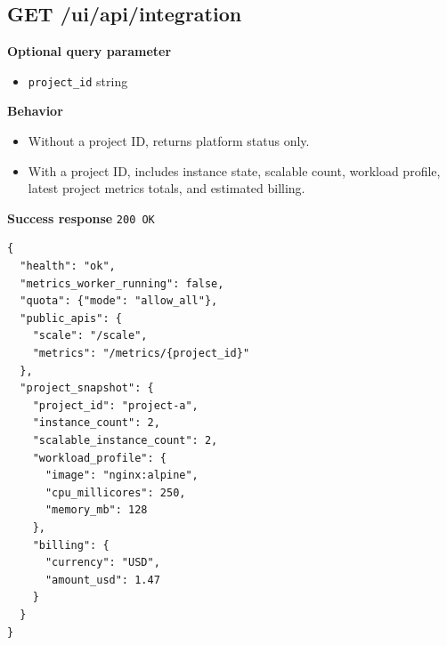 \documentclass[11pt]{article}
\begin{document}
\subsection*{GET /ui/api/integration}
\textbf{Optional query parameter}
\begin{itemize}
\item \texttt{project\_id} string
\end{itemize}
\textbf{Behavior}
\begin{itemize}
\item Without a project ID, returns platform status only.
\item With a project ID, includes instance state, scalable count, workload profile, latest project metrics totals, and estimated billing.
\end{itemize}
\textbf{Success response} \texttt{200 OK}
\begin{verbatim}
{
  "health": "ok",
  "metrics_worker_running": false,
  "quota": {"mode": "allow_all"},
  "public_apis": {
    "scale": "/scale",
    "metrics": "/metrics/{project_id}"
  },
  "project_snapshot": {
    "project_id": "project-a",
    "instance_count": 2,
    "scalable_instance_count": 2,
    "workload_profile": {
      "image": "nginx:alpine",
      "cpu_millicores": 250,
      "memory_mb": 128
    },
    "billing": {
      "currency": "USD",
      "amount_usd": 1.47
    }
  }
}
\end{verbatim}
\end{document}
